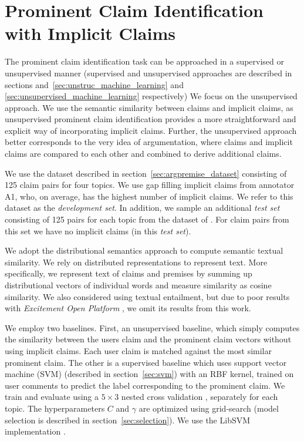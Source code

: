\section{Prominent Claim Identification with Implicit Claims}

The prominent claim identification task can be approached in a supervised or
unsupervised manner (supervised and unsupervised approaches are described in 
sections and~\ref{sec:unstruc_machine_learning} and
\ref{sec:unsupervised_machine_learning} respectively)
We focus on the unsupervised approach. 
We use the semantic similarity between claims and implicit claims, as
unsupervised prominent claim identification provides a more straightforward and
explicit way of incorporating implicit claims. 
Further, the unsupervised approach better corresponds to the very idea of
argumentation, 
where claims and implicit claims are compared to each other and combined to 
derive additional claims. 

We use the dataset described in section~\ref{sec:argpremise_dataset} 
consisting of 125 claim pairs for four topics. 
We use gap filling implicit claims from annotator A1, who, on average, has the
highest number of implicit claims. 
We refer to this dataset as the \emph{development set}.
In addition, we sample an additional \emph{test set} consisting of 125 pairs for each topic
from the dataset of \citet{hasan2014you}. 
For claim pairs from this set we have no
implicit claims (in this \emph{test set}). 

We adopt the distributional semantics approach to compute semantic textual similarity. 
We rely on distributed representations \citep{mikolov2013distributed} to represent text. 
More specifically, we represent text of claims and premises by summing up distributional
vectors of individual words and measure similarity as cosine similarity. 
We also considered using textual entailment,
but due to poor results with \textit{Excitement Open Platform}
\citep{pado2015design}, we omit its results from this work. 

We employ two baselines.  First, an unsupervised baseline, which simply
computes the similarity between the users claim and the prominent claim vectors
without using implicit claims. 
Each user claim is matched against the most similar prominent claim. 
The other is a supervised baseline which uses support vector machine (SVM)
(described in section~\ref{sec:svm}) with an RBF kernel, trained 
on user comments to predict the label corresponding to the 
prominent claim. 
We train and evaluate using a $5 \times 3$ nested cross validation , separately for each topic. 
The hyperparameters $C$ and $\gamma$ are optimized using grid-search
(model selection is described in section~\ref{sec:selection}). 
We use the LibSVM implementation \citep{chang2011libsvm}. 

